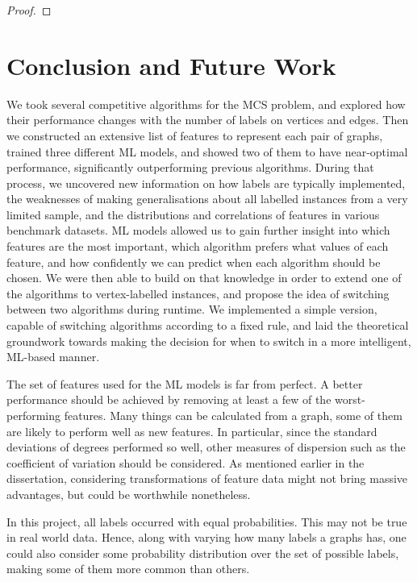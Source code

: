 \documentclass{l4proj}
\theoremstyle{definition}
\theoremstyle{remark}
\begin{document}
\begin{proof}
  
\end{proof}

\chapter{Conclusion and Future Work}

We took several competitive algorithms for the MCS problem, and explored how their
performance changes with the number of labels on vertices and edges. Then we
constructed an extensive list of features to represent each pair of graphs,
trained three different ML models, and showed two of them to have near-optimal
performance, significantly outperforming previous algorithms. During that
process, we uncovered new information on how labels are typically implemented,
the weaknesses of making generalisations about all labelled instances from a
very limited sample, and the distributions and correlations of features in
various benchmark datasets. ML models allowed us to gain further insight into
which features are the most important, which algorithm prefers what values of
each feature, and how confidently we can predict when each algorithm should be
chosen. We were then able to build on that knowledge in order to extend one of
the algorithms to vertex-labelled instances, and propose the idea of switching
between two algorithms during runtime. We implemented a simple version, capable
of switching algorithms according to a fixed rule, and laid the theoretical
groundwork towards making the decision for when to switch in a more intelligent,
ML-based manner.

The set of features used for the ML models is far from perfect. A better
performance should be achieved by removing at least a few of the
worst-performing features. Many things can be calculated from a graph, some of
them are likely to perform well as new features. In particular, since the
standard deviations of degrees performed so well, other measures of dispersion
such as the coefficient of variation should be considered. As mentioned earlier
in the dissertation, considering transformations of feature data might not bring
massive advantages, but could be worthwhile nonetheless.

In this project, all labels occurred with equal probabilities. This may not be
true in real world data. Hence, along with varying how many labels a graphs has,
one could also consider some probability distribution over the set of possible
labels, making some of them more common than others.
\end{document}
